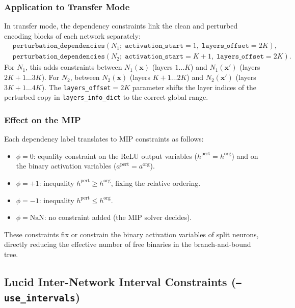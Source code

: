 \documentclass[11pt,a4paper]{article}
\theoremstyle{definition}
\theoremstyle{plain}
\newcommand{\NN}[1]{N_{#1}}
\newcommand{\vx}{\mathbf{x}}
\newcommand{\vxp}{\mathbf{x}'}
\begin{document}
\subsubsection{Application to Transfer Mode}

In transfer mode, the dependency constraints link the clean and perturbed encoding blocks of each network separately:
\begin{align*}
  &\texttt{perturbation\_dependencies}(\NN{1};\;\mathtt{activation\_start}=1,\;\mathtt{layers\_offset}=2K), \\
  &\texttt{perturbation\_dependencies}(\NN{2};\;\mathtt{activation\_start}=K+1,\;\mathtt{layers\_offset}=2K).
\end{align*}
For $\NN{1}$, this adds constraints between $\NN{1}(\vx)$ (layers $1\ldots K$) and $\NN{1}(\vxp)$ (layers $2K+1\ldots 3K$). For $\NN{2}$, between $\NN{2}(\vx)$ (layers $K+1\ldots 2K$) and $\NN{2}(\vxp)$ (layers $3K+1\ldots 4K$). The \texttt{layers\_offset}$=2K$ parameter shifts the layer indices of the perturbed copy in \texttt{layers\_info\_dict} to the correct global range.

\subsubsection{Effect on the MIP}

Each dependency label translates to MIP constraints as follows:
\begin{itemize}
  \item $\phi = 0$: equality constraint on the ReLU output variables ($h^{\mathrm{pert}} = h^{\mathrm{org}}$) and on the binary activation variables ($a^{\mathrm{pert}} = a^{\mathrm{org}}$).
  \item $\phi = +1$: inequality $h^{\mathrm{pert}} \ge h^{\mathrm{org}}$, fixing the relative ordering.
  \item $\phi = -1$: inequality $h^{\mathrm{pert}} \le h^{\mathrm{org}}$.
  \item $\phi = \mathrm{NaN}$: no constraint added (the MIP solver decides).
\end{itemize}
These constraints fix or constrain the binary activation variables of split neurons, directly reducing the effective number of free binaries in the branch-and-bound tree.

\subsection{Lucid Inter-Network Interval Constraints (\texttt{--use\_intervals})}
\label{sec:lucid_intervals}
\end{document}
